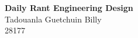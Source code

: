 \documentclass[11pt, a4paper]{article}
\begin{document}
\begin{center}
  \LARGE\textbf{Daily Rant Engineering Design}\\
  Tadouanla Guetchuin Billy\\
  28177
\end{center}




\end{document}
